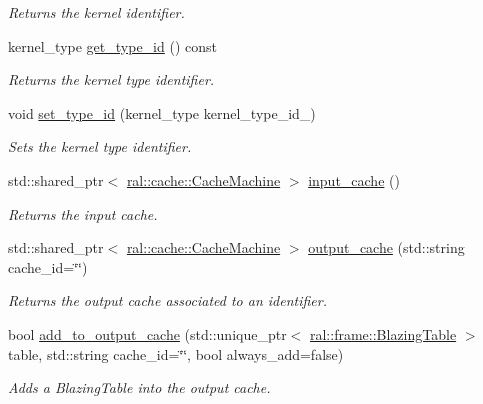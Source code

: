 \begin{DoxyCompactItemize}
\begin{DoxyCompactList}\small\item\em Returns the kernel identifier. \end{DoxyCompactList}\item 
kernel\+\_\+type \hyperlink{classral_1_1cache_1_1kernel_a146246668880ca685f22d208e638578b}{get\+\_\+type\+\_\+id} () const
\begin{DoxyCompactList}\small\item\em Returns the kernel type identifier. \end{DoxyCompactList}\item 
void \hyperlink{classral_1_1cache_1_1kernel_ae4a8519fe026454fe5385122c1e02615}{set\+\_\+type\+\_\+id} (kernel\+\_\+type kernel\+\_\+type\+\_\+id\+\_\+)
\begin{DoxyCompactList}\small\item\em Sets the kernel type identifier. \end{DoxyCompactList}\item 
\mbox{\label{classral_1_1cache_1_1kernel_aac90d80ed296715da2a7736691847270}} 
std\+::shared\+\_\+ptr$<$ \hyperlink{classral_1_1cache_1_1CacheMachine}{ral\+::cache\+::\+Cache\+Machine} $>$ \hyperlink{classral_1_1cache_1_1kernel_aac90d80ed296715da2a7736691847270}{input\+\_\+cache} ()
\begin{DoxyCompactList}\small\item\em Returns the input cache. \end{DoxyCompactList}\item 
std\+::shared\+\_\+ptr$<$ \hyperlink{classral_1_1cache_1_1CacheMachine}{ral\+::cache\+::\+Cache\+Machine} $>$ \hyperlink{classral_1_1cache_1_1kernel_a94c3bd66b93a0e67165d0a54741c19dc}{output\+\_\+cache} (std\+::string cache\+\_\+id=\char`\"{}\char`\"{})
\begin{DoxyCompactList}\small\item\em Returns the output cache associated to an identifier. \end{DoxyCompactList}\item 
bool \hyperlink{classral_1_1cache_1_1kernel_af6b7b538f6a692393f314a4f1037d4a6}{add\+\_\+to\+\_\+output\+\_\+cache} (std\+::unique\+\_\+ptr$<$ \hyperlink{classral_1_1frame_1_1BlazingTable}{ral\+::frame\+::\+Blazing\+Table} $>$ table, std\+::string cache\+\_\+id=\char`\"{}\char`\"{}, bool always\+\_\+add=false)
\begin{DoxyCompactList}\small\item\em Adds a Blazing\+Table into the output cache. \end{DoxyCompactList}\item 

\end{DoxyCompactItemize}
